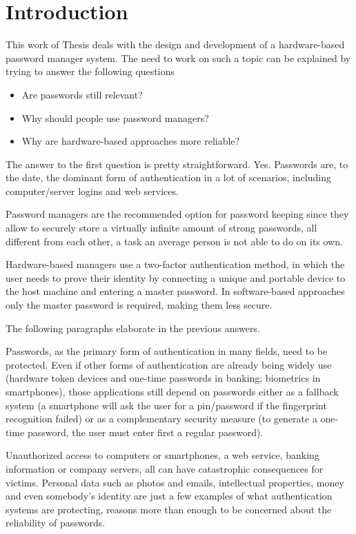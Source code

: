 \chapter{Introduction}

This work of Thesis deals with the design and development of a hardware-based password manager system. The need to work on such a topic can be explained by trying to answer the following questions

\begin{itemize}
\setlength\itemsep{-3pt}
\item Are passwords still relevant?
\item Why should people use password managers?
\item Why are hardware-based approaches more reliable?
\end{itemize}

The answer to the first question is pretty straightforward. Yes. Passwords are, to the date, the dominant form of authentication in a lot of scenarios, including computer/server logins and web services. 

Password managers are the recommended option for password keeping since they allow to securely store a virtually infinite amount of strong passwords, all different from each other, a task an average person is not able to do on its own.

Hardware-based managers use a two-factor authentication method, in which the user needs to prove their identity by connecting a unique and portable device to the host machine and entering a master password. In software-based approaches only the master password is required, making them less secure.

\vspace{8pt}
\noindent
The following paragraphs elaborate in the previous answers.

\vspace{6pt}
Passwords, as the primary form of authentication in many fields, need to be protected. Even if other forms of authentication are already being widely use (hardware token devices and one-time passwords in banking; biometrics in smartphones), those applications still depend on passwords either as a fallback system (a smartphone will ask the user for a pin/password if the fingerprint recognition failed) or as a complementary security measure (to generate a one-time password, the user must enter first a regular password).

Unauthorized access to computers or smartphones, a web service, banking information or company servers, all can have catastrophic consequences for victims. Personal data such as photos and emails, intellectual properties, money and even somebody’s identity are just a few examples of what authentication systems are protecting, reasons more than enough to be concerned about the reliability of passwords.


